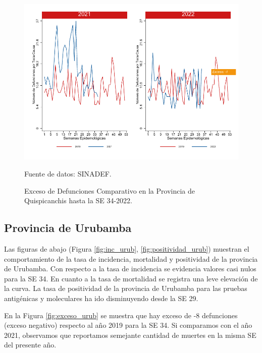 \documentclass[12pt,a4paper,openany]{book}
\begin{document}
	\begin{figure}[h]
		\caption{Exceso de Defunciones Comparativo en la Provincia de Quispicanchis hasta la SE 34-2022.}\label{fig:exceso_quisp}
		\begin{center}
			\includegraphics[width=0.7\linewidth]{../figuras/exceso_12.pdf}
		\end{center}
		{\footnotesize {Fuente de datos: SINADEF.}}
	\end{figure}
	
	\clearpage
	
	\subsection*{Provincia de Urubamba}
	\noindent Las figuras de abajo (Figura \ref{fig:inc_urub}, \ref{fig:positividad_urub}) muestran el comportamiento de la tasa de incidencia, mortalidad y positividad de la provincia de Urubamba. Con respecto a la tasa de incidencia se evidencia valores casi nulos para la SE 34. En cuanto a la tasa de mortalidad se registra una leve elevación de la curva. La tasa de positividad de la provincia de Urubamba para las pruebas antigénicas y moleculares ha ido disminuyendo desde la SE 29.
	
	En la Figura \ref{fig:exceso_urub} se muestra que hay exceso de -8 defunciones (exceso negativo) respecto al año 2019 para la SE 34. Si comparamos con el año 2021, observamos que reportamos semejante cantidad de muertes en la misma SE del presente año.
	
\end{document}
